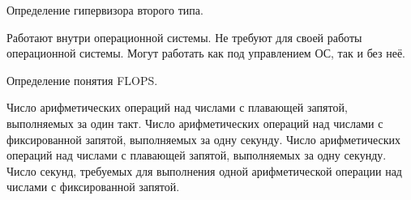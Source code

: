 \begin{questions}
\question[3] Определение гипервизора второго типа.
\begin{choices}
\correctchoice Работают внутри операционной системы.
\choice Не требуют для своей работы операционной системы.
\choice  Могут работать как под управлением ОС, так и без неё.
\end{choices}

\question[3] Определение понятия FLOPS.
\begin{choices}
\choice Число арифметических операций над числами с плавающей запятой, выполняемых за один такт.
\choice Число арифметических операций над числами с фиксированной запятой, выполняемых за одну секунду.
\correctchoice Число арифметических операций над числами с плавающей запятой, выполняемых за одну секунду.
\choice Число секунд, требуемых для выполнения одной арифметической операции над числами с фиксированной запятой.
\end{choices}


\end{questions}

